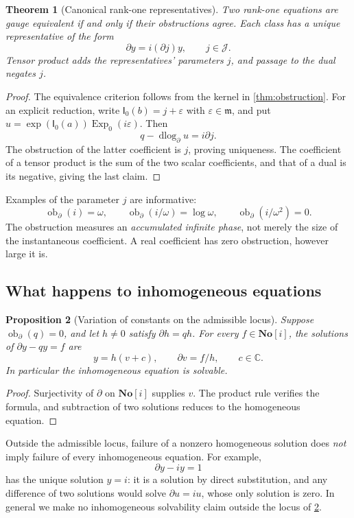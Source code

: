 \documentclass[11pt,a4paper]{article}
\newtheorem{theorem}{Theorem}[section]
\newtheorem{proposition}[theorem]{Proposition}
\theoremstyle{definition}
\newcommand{\SC}{\mathbf{No}[i]}
\newcommand{\C}{\mathbb C}
\newcommand{\D}{\partial}
\newcommand{\mm}{\mathfrak m}
\newcommand{\JJ}{\mathcal J}
\newcommand{\Expzero}{\operatorname{Exp}_0}
\newcommand{\dlog}{\operatorname{dlog}_{\D}}
\newcommand{\Ob}{\operatorname{ob}_{\D}}
\newcommand{\Ip}{\mathsf I_0}
\numberwithin{equation}{section}
\begin{document}
\begin{theorem}[Canonical rank-one representatives]\label{thm:gauge}
Two rank-one equations are gauge equivalent if and only if their
obstructions agree. Each class has a unique representative of the form
\begin{equation}\label{eq:canonicalgauge}
 \D y=i(\D j)y,\qquad j\in\JJ.
\end{equation}
Tensor product adds the representatives' parameters $j$, and passage to
the dual negates $j$.
\end{theorem}
\begin{proof}
The equivalence criterion follows from the kernel in
\cref{thm:obstruction}. For an explicit reduction, write
$\Ip(b)=j+\varepsilon$ with $\varepsilon\in\mm$, and put
$u=\exp(\Ip(a))\Expzero(i\varepsilon)$. Then
\[
 q-\dlog u=i\D j.
\]
The obstruction of the latter coefficient is $j$, proving uniqueness.
The coefficient of a tensor product is the sum of the two scalar
coefficients, and that of a dual is its negative, giving the last claim.
\end{proof}
Examples of the parameter $j$ are informative:
\[
 \Ob(i)=\omega,\qquad
 \Ob(i/\omega)=\log\omega,\qquad
 \Ob(i/\omega^2)=0.
\]
The obstruction measures an \emph{accumulated infinite phase}, not merely
the size of the instantaneous coefficient. A real coefficient has zero
obstruction, however large it is.

\subsection{What happens to inhomogeneous equations}
\begin{proposition}[Variation of constants on the admissible locus]
\label{prop:inhom}
Suppose $\Ob(q)=0$, and let $h\ne0$ satisfy $\D h=qh$. For every
$f\in\SC$, the solutions of
$\D y-qy=f$ are
\[
 y=h(v+c),\qquad\D v=f/h,\qquad c\in\C.
\]
In particular the inhomogeneous equation is solvable.
\end{proposition}
\begin{proof}
Surjectivity of $\D$ on $\SC$ supplies $v$. The product rule verifies
the formula, and subtraction of two solutions reduces to the homogeneous
equation.
\end{proof}
Outside the admissible locus, failure of a nonzero homogeneous solution
does \emph{not} imply failure of every inhomogeneous equation. For example,
\[
 \D y-iy=1
\]
has the unique solution $y=i$: it is a solution by direct substitution,
and any difference of two solutions would solve $\D u=iu$, whose only
solution is zero. In general we make no inhomogeneous solvability claim
outside the locus of \cref{prop:inhom}.
\end{document}
